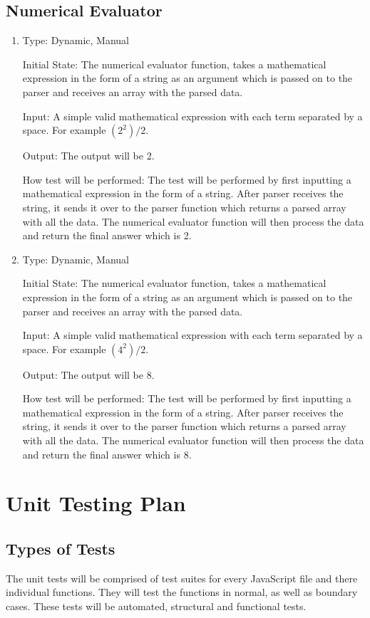 \documentclass[12pt, titlepage]{article}
\begin{document}
\subsection{Numerical Evaluator}
\begin{enumerate}
\item{}
Type: Dynamic, Manual

Initial State: The numerical evaluator function, takes a mathematical expression in the form of a string as an argument which is passed on to the parser and receives an array with the parsed data.

Input: A simple valid mathematical expression with each term separated by a space. For example \((2^2)/2\).

Output: The output will be 2.

How test will be performed: The test will be performed by first inputting a mathematical expression in the form of a string. After parser receives the string, it sends it over to the parser function which returns a parsed array with all the data. The numerical evaluator function will then process the data and return the final answer which is 2.

\item{}
Type: Dynamic, Manual

Initial State: The numerical evaluator function, takes a mathematical expression in the form of a string as an argument which is passed on to the parser and receives an array with the parsed data.

Input: A simple valid mathematical expression with each term separated by a space. For example \((4^2)/2\).

Output: The output will be 8.

How test will be performed: The test will be performed by first inputting a mathematical expression in the form of a string. After parser receives the string, it sends it over to the parser function which returns a parsed array with all the data. The numerical evaluator function will then process the data and return the final answer which is 8.
\end{enumerate}
				
\section{Unit Testing Plan}
		
\subsection{Types of Tests}
The unit tests will be comprised of test suites for every JavaScript file and there individual functions. They will test the functions in normal, as well as boundary cases. These tests will be automated, structural and functional tests.
\end{document}
